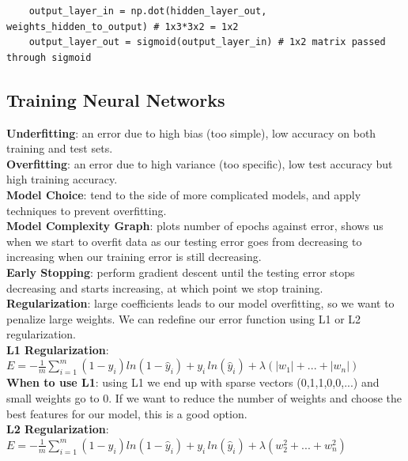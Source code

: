 \documentclass[11pt, a4paper]{article}
\begin{document}
\begin{spacing}{1.1}
\begin{lstlisting}
	output_layer_in = np.dot(hidden_layer_out, weights_hidden_to_output) # 1x3*3x2 = 1x2
	output_layer_out = sigmoid(output_layer_in) # 1x2 matrix passed through sigmoid
	\end{lstlisting} \vspace*{2mm}
	
	\subsection{Training Neural Networks}
	\textbf{Underfitting}: an error due to high bias (too simple), low accuracy on both training and test sets.\vspace*{2mm}\\
	\textbf{Overfitting}: an error due to high variance (too specific), low test accuracy but high training accuracy. \vspace*{2mm}\\
	\textbf{Model Choice}: tend to the side of more complicated models, and apply techniques to prevent overfitting.\vspace*{2mm}\\
	\textbf{Model Complexity Graph}: plots number of epochs against error, shows us when we start to overfit data as our testing error goes from decreasing to increasing when our training error is still decreasing.\vspace*{2mm}\\
	\textbf{Early Stopping}: perform gradient descent until the testing error stops decreasing and starts increasing, at which point we stop training. \vspace*{2mm}\\
	\textbf{Regularization}: large coefficients leads to our model overfitting, so we want to penalize large weights. We can redefine our error function using L1 or L2 regularization. \vspace*{2mm}\\
	\textbf{L1 Regularization}: $E = -\frac{1}{m} \sum_{i=1}^m(1-y_i)ln(1-\hat{y}_i) + y_i\, ln(\hat{y}_i) + \lambda(|w_1| + ... + |w_n|)$\vspace*{2mm}\\
	\textbf{When to use L1}: using L1 we end up with sparse vectors (0,1,1,0,0,...) and small weights go to 0. If we want to reduce the number of weights and choose the best features for our model, this is a good option.\vspace*{2mm}\\
	\textbf{L2 Regularization}: $E = -\frac{1}{m} \sum_{i=1}^m(1-y_i)ln(1-\hat{y}_i) + y_i\, ln(\hat{y}_i) + \lambda(w_2^2 + ... + w_n^2)$\vspace*{2mm}\\

\end{spacing}
\end{document}
